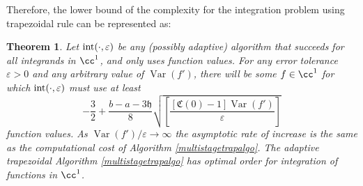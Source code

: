 \documentclass{iitthesis}
\DeclareMathOperator{\Var}{Var}
\newtheorem{theorem}{Theorem}
\theoremstyle{definition}
\theoremstyle{remark}
\begin{document}
Therefore, the lower bound of the complexity for the integration problem using trapezoidal rule can be represented as:
\begin{theorem} \label{comptrap}
Let $\textup{int}(\cdot,\varepsilon)$ be any (possibly adaptive) algorithm that succeeds for all integrands in $\cc^1$, and only uses function values. For any error tolerance $\varepsilon > 0$ and any arbitrary value of $\Var(f')$, there will be some $f\in \cc^1$ for which $\textup{int}(\cdot,\varepsilon)$ must use at least
    \begin{equation}\label{complowbdtrap}
        -\frac{3}{2}+\frac{b-a-3\mathfrak{h}}{8}\sqrt{\left[\frac{[\mathfrak{C}(0)-1]\Var( f')}{\varepsilon}\right]}
    \end{equation}
    function values. As $\Var(f')/\varepsilon \rightarrow \infty$ the asymptotic rate of increase is the same as the computational cost of Algorithm \ref{multistagetrapalgo}. The adaptive trapezoidal Algorithm \ref{multistagetrapalgo} has optimal order for integration of functions in $\cc^1$.
\end{theorem}
\end{document}
